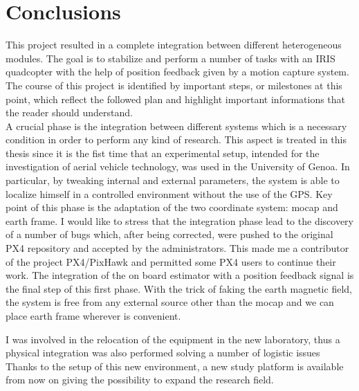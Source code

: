 \def\baselinestretch{1}
\chapter{Conclusions}
\label{chap:conclusions}
\ifpdf
    \graphicspath{{Conclusions/Figures/PNG/}{Conclusions/Figures/PDF/}{Conclusions/Figures/}}
\else
    \graphicspath{{Conclusions/Figures/EPS/}{Conclusions/Figures/}}
\fi
\def\baselinestretch{1.66}

This project resulted in a complete integration between different heterogeneous modules. The goal is to stabilize and perform a number of tasks with an IRIS quadcopter with the help of position feedback given by a motion capture system. The course of this project is identified by important steps, or milestones at this point, which reflect the followed plan and highlight important informations that the reader should understand. \\

\noindent
A crucial phase is the integration between different systems which is a necessary condition in order to perform any kind of research. This aspect is treated in this thesis since it is the fist time that an experimental setup, intended for the investigation of aerial vehicle technology, was used in the University of Genoa. In particular, by tweaking internal and external parameters, the system is able to localize himself in a controlled environment without the use of the GPS. Key point of this phase is the adaptation of the two coordinate system: mocap and earth frame. I would like to stress that the integration phase lead to the discovery of a number of bugs which, after being corrected, were pushed to the original PX4 repository and accepted by the administrators. This made me a contributor of the project PX4/PixHawk and permitted some PX4 users to continue their work. The integration of the on board estimator with a position feedback signal is the final step of this first phase. With the trick of faking the earth magnetic field, the system is free from any external source other than the mocap and we can place earth frame wherever is convenient.

I was involved in the relocation of the equipment in the new laboratory, thus a physical integration was also performed solving a number of logistic issues  Thanks to the setup of this new environment, a new study platform is available from now on giving the possibility to expand the research field.

